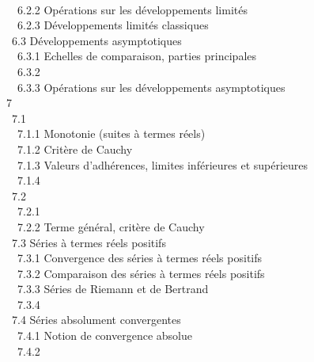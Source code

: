 \documentclass[]{article}
\begin{document}
\\ ~~6.2.2 {Opérations sur les
développements limités} \\ ~~6.2.3
{Développements limités
classiques} \\ ~6.3 {Développements
asymptotiques} \\ ~~6.3.1
{Echelles de comparaison, parties
principales} \\ ~~6.3.2
 \\
~~6.3.3 {Opérations sur les
développements asymptotiques} \\ 7
 \\ ~7.1
 \\ ~~7.1.1
{Monotonie (suites à termes
réels)} \\ ~~7.1.2 {Critère de
Cauchy} \\ ~~7.1.3 {Valeurs
d'adhérences, limites inférieures et supérieures} \\ ~~7.1.4
 \\ ~7.2
 \\
~~7.2.1  \\
~~7.2.2 {Terme général, critère de
Cauchy} \\ ~7.3 {Séries à termes
réels positifs} \\ ~~7.3.1
{Convergence des séries à termes
réels positifs} \\ ~~7.3.2
{Comparaison des séries à termes
réels positifs} \\ ~~7.3.3 {Séries
de Riemann et de Bertrand} \\ ~~7.3.4
 \\
~7.4 {Séries absolument
convergentes} \\ ~~7.4.1 {Notion
de convergence absolue} \\ ~~7.4.2
\end{document}
